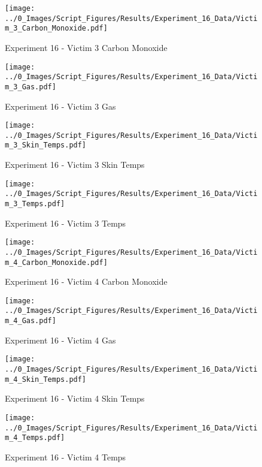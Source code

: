 	\begin{figure}[H]
		\centering
		\texttt{[image: ../0\_Images/Script\_Figures/Results/Experiment\_16\_Data/Victim\_3\_Carbon\_Monoxide.pdf]}
		\caption[]{Experiment 16 - Victim 3 Carbon Monoxide}
	\end{figure}
 
	\clearpage

	\begin{figure}[H]
		\centering
		\texttt{[image: ../0\_Images/Script\_Figures/Results/Experiment\_16\_Data/Victim\_3\_Gas.pdf]}
		\caption[]{Experiment 16 - Victim 3 Gas}
	\end{figure}
 

	\begin{figure}[H]
		\centering
		\texttt{[image: ../0\_Images/Script\_Figures/Results/Experiment\_16\_Data/Victim\_3\_Skin\_Temps.pdf]}
		\caption[]{Experiment 16 - Victim 3 Skin Temps}
	\end{figure}
 
	\clearpage

	\begin{figure}[H]
		\centering
		\texttt{[image: ../0\_Images/Script\_Figures/Results/Experiment\_16\_Data/Victim\_3\_Temps.pdf]}
		\caption[]{Experiment 16 - Victim 3 Temps}
	\end{figure}
 

	\begin{figure}[H]
		\centering
		\texttt{[image: ../0\_Images/Script\_Figures/Results/Experiment\_16\_Data/Victim\_4\_Carbon\_Monoxide.pdf]}
		\caption[]{Experiment 16 - Victim 4 Carbon Monoxide}
	\end{figure}
 
	\clearpage

	\begin{figure}[H]
		\centering
		\texttt{[image: ../0\_Images/Script\_Figures/Results/Experiment\_16\_Data/Victim\_4\_Gas.pdf]}
		\caption[]{Experiment 16 - Victim 4 Gas}
	\end{figure}
 

	\begin{figure}[H]
		\centering
		\texttt{[image: ../0\_Images/Script\_Figures/Results/Experiment\_16\_Data/Victim\_4\_Skin\_Temps.pdf]}
		\caption[]{Experiment 16 - Victim 4 Skin Temps}
	\end{figure}
 
	\clearpage

	\begin{figure}[H]
		\centering
		\texttt{[image: ../0\_Images/Script\_Figures/Results/Experiment\_16\_Data/Victim\_4\_Temps.pdf]}
		\caption[]{Experiment 16 - Victim 4 Temps}
	\end{figure}
 


